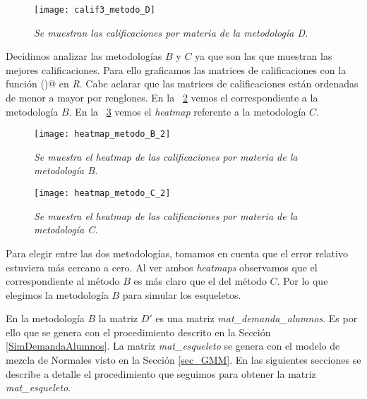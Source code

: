 \begin{figure}[H]
\centering
\texttt{[image: calif3\_metodo\_D]} %
\caption[\textit{Metodología D}]{\textit{Se muestran las calificaciones por materia de la metodología D.}}\label{fig_metodo_D}
\end{figure} 


Decidimos analizar las metodologías $B$ y $C$ ya que son las que muestran las mejores calificaciones. Para ello graficamos las matrices de calificaciones con la función \verb@heatmap()@ en \textit{R}. Cabe aclarar que las matrices de calificaciones están ordenadas de menor a mayor por renglones. En la \figurename{~\ref{fig_heatmap_B}} vemos el correspondiente a la metodología $B$. En la \figurename{~\ref{fig_heatmap_C}} vemos el \textit{heatmap} referente a la metodología $C$.

\begin{figure}[H]
\centering
\texttt{[image: heatmap\_metodo\_B\_2]} %
\caption[\textit{Heatmap metodología B}]{\textit{Se muestra el heatmap de las calificaciones por materia de la metodología B.}}\label{fig_heatmap_B}
\end{figure}

\begin{figure}[H]
\centering
\texttt{[image: heatmap\_metodo\_C\_2]} %
\caption[\textit{Heatmap metodología C}]{\textit{Se muestra el heatmap de las calificaciones por materia de la metodología C.}}\label{fig_heatmap_C}
\end{figure}


Para elegir entre las dos metodologías, tomamos en cuenta que el error relativo estuviera más cercano a cero. Al ver ambos \textit{heatmaps} observamos que el correspondiente al método $B$ es más claro que el del método $C$. Por lo que elegimos la metodología $B$ para simular los esqueletos. %

En la metodología $B$ la matriz $D'$ es una matriz \textit{mat\_demanda\_alumnos}. Es por ello que se genera con el procedimiento descrito en la Sección \ref{SimDemandaAlumnos}. La matriz \textit{mat\_esqueleto} se genera con el modelo de mezcla de Normales visto en la Sección \ref{sec_GMM}. En las siguientes secciones se describe a detalle el procedimiento que seguimos para obtener la matriz \textit{mat\_esqueleto}.

